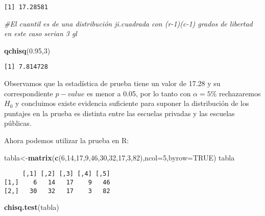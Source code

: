 \documentclass[
  a4paper,
  oneside,
  openany]{book}
\newenvironment{Shaded}{\begin{snugshade}}{\end{snugshade}}
\newcommand{\CommentTok}[1]{\textcolor[rgb]{0.56,0.35,0.01}{\textit{#1}}}
\newcommand{\DataTypeTok}[1]{\textcolor[rgb]{0.13,0.29,0.53}{#1}}
\newcommand{\DecValTok}[1]{\textcolor[rgb]{0.00,0.00,0.81}{#1}}
\newcommand{\FloatTok}[1]{\textcolor[rgb]{0.00,0.00,0.81}{#1}}
\newcommand{\KeywordTok}[1]{\textcolor[rgb]{0.13,0.29,0.53}{\textbf{#1}}}
\newcommand{\NormalTok}[1]{#1}
\newcommand{\OtherTok}[1]{\textcolor[rgb]{0.56,0.35,0.01}{#1}}
\begin{document}
\begin{verbatim}
[1] 17.28581
\end{verbatim}

\begin{Shaded}
\begin{Highlighting}[]
\CommentTok{\#El cuantil es de una distribución ji.cuadrada con (r{-}1)(c{-}1) grados de libertad en este caso serian 3 gl}

\KeywordTok{qchisq}\NormalTok{(}\FloatTok{0.95}\NormalTok{,}\DecValTok{3}\NormalTok{)}
\end{Highlighting}
\end{Shaded}

\begin{verbatim}
[1] 7.814728
\end{verbatim}

Observamos que la estadística de prueba tiene un valor de 17.28 y su correspondiente \(p-value\) es menor a 0.05, por lo tanto con \(\alpha=5\%\) rechazaremos \(H_0\) y concluimos existe evidencia suficiente para suponer la distribución de los puntajes en la prueba es distinta entre las escuelas privadas y las escuelas públicas.

Ahora podemos utilizar la prueba en R:

\begin{Shaded}
\begin{Highlighting}[]
\NormalTok{tabla\textless{}{-}}\KeywordTok{matrix}\NormalTok{(}\KeywordTok{c}\NormalTok{(}\DecValTok{6}\NormalTok{,}\DecValTok{14}\NormalTok{,}\DecValTok{17}\NormalTok{,}\DecValTok{9}\NormalTok{,}\DecValTok{46}\NormalTok{,}\DecValTok{30}\NormalTok{,}\DecValTok{32}\NormalTok{,}\DecValTok{17}\NormalTok{,}\DecValTok{3}\NormalTok{,}\DecValTok{82}\NormalTok{),}\DataTypeTok{ncol=}\DecValTok{5}\NormalTok{,}\DataTypeTok{byrow=}\OtherTok{TRUE}\NormalTok{)}
\NormalTok{tabla}
\end{Highlighting}
\end{Shaded}

\begin{verbatim}
     [,1] [,2] [,3] [,4] [,5]
[1,]    6   14   17    9   46
[2,]   30   32   17    3   82
\end{verbatim}

\begin{Shaded}
\begin{Highlighting}[]
\KeywordTok{chisq.test}\NormalTok{(tabla)}
\end{Highlighting}
\end{Shaded}
\end{document}
